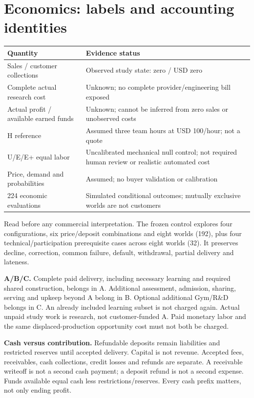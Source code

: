 \documentclass[10pt]{article}
\begin{document}
\section{Economics: labels and accounting identities}
\begin{tabularx}{\textwidth}{@{}p{42mm}Y@{}}
\toprule
Quantity & Evidence status\\\midrule
Sales / customer collections & Observed study state: zero / USD zero\\
Complete actual research cost & Unknown; no complete provider/engineering bill exposed\\
Actual profit / available earned funds & Unknown; cannot be inferred from zero sales or unobserved costs\\
H reference & Assumed three team hours at USD 100/hour; not a quote\\
U/E/E+ equal labor & Uncalibrated mechanical null control; not required human review or realistic automated cost\\
Price, demand and probabilities & Assumed; no buyer validation or calibration\\
224 economic evaluations & Simulated conditional outcomes; mutually exclusive worlds are not customers\\
\bottomrule
\end{tabularx}

Read  before any commercial interpretation. The frozen control explores four configurations, six price/deposit combinations and eight worlds (192), plus four technical/participation prerequisite cases across eight worlds (32). It preserves decline, correction, common failure, default, withdrawal, partial delivery and lateness.

\textbf{A/B/C.} Complete paid delivery, including necessary learning and required shared construction, belongs in A. Additional assessment, admission, sharing, serving and upkeep beyond A belong in B. Optional additional Gym/R\&D belongs in C. An already included learning subset is not charged again. Actual unpaid study work is research, not customer-funded A. Paid monetary labor and the same displaced-production opportunity cost must not both be charged.

\textbf{Cash versus contribution.} Refundable deposits remain liabilities and restricted reserves until accepted delivery. Capital is not revenue. Accepted fees, receivables, cash collections, credit losses and refunds are separate. A receivable writeoff is not a second cash payment; a deposit refund is not a second expense. Funds available equal cash less restrictions/reserves. Every cash prefix matters, not only ending profit.
\end{document}
